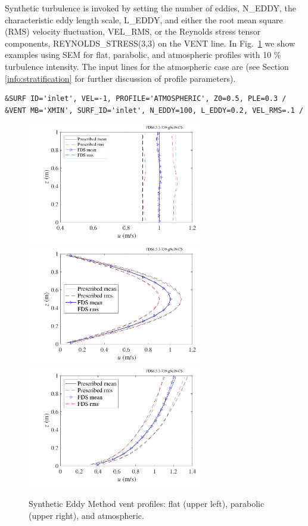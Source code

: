 \documentclass[11pt]{book}
\begin{document}
Synthetic turbulence is invoked by setting the number of eddies, {\ct N\_EDDY}, the characteristic eddy length scale, {\ct L\_EDDY}, and either the root mean square (RMS)
velocity fluctuation, {\ct VEL\_RMS}, or the Reynolds stress tensor components, {\ct REYNOLDS\_STRESS(3,3)} on the {\ct VENT} line.  In Fig.~\ref{fig:sem_profiles} we show examples using SEM for flat, parabolic, and atmospheric profiles with 10 \% turbulence intensity.  The input lines for the atmospheric case are (see Section \ref{info:stratification} for further discussion of profile parameters).

\begin{lstlisting}
&SURF ID='inlet', VEL=-1, PROFILE='ATMOSPHERIC', Z0=0.5, PLE=0.3 /
&VENT MB='XMIN', SURF_ID='inlet', N_EDDY=100, L_EDDY=0.2, VEL_RMS=.1 /
\end{lstlisting}

\begin{figure}[ht]
\centering
\includegraphics[width=3in]{SCRIPT_FIGURES/sem_flat_leddy_p2.pdf}
\includegraphics[width=3in]{SCRIPT_FIGURES/sem_par_leddy_p2.pdf}
\includegraphics[width=3in]{SCRIPT_FIGURES/sem_atm_leddy_p2.pdf}
\caption[Synthetic Eddy Method vent profiles]{Synthetic Eddy Method vent profiles: flat (upper left), parabolic (upper right), and atmospheric.}
\label{fig:sem_profiles}
\end{figure}
\end{document}

